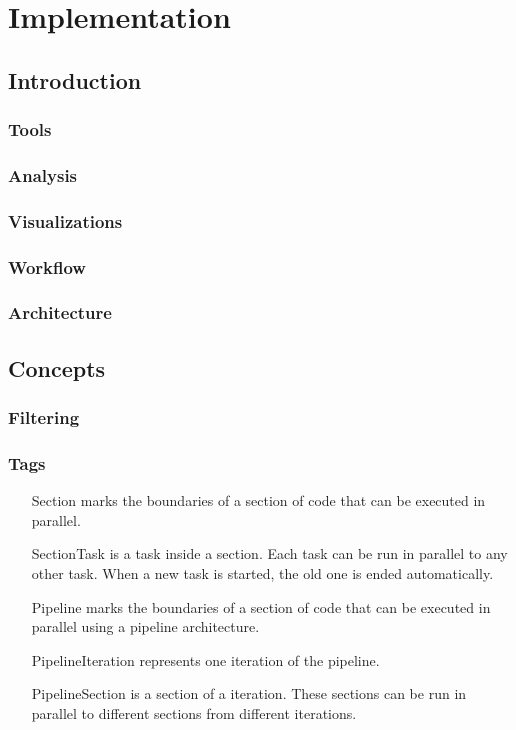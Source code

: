 \chapter{Implementation}

\section{Introduction}

\subsection{Tools}
\subsection{Analysis}
\subsection{Visualizations}
\subsection{Workflow}
\subsection{Architecture}

\section{Concepts}

\subsection{Filtering}

\subsection{Tags}

\begin{itemize}
	\item [Section] marks the boundaries of a section of code that can be executed in parallel.
	\item [SectionTask] is a task inside a section. Each task can be run in parallel to any other task. When a new task is started, the old one is ended automatically.
	\item [Pipeline] marks the boundaries of a section of code that can be executed in parallel using a pipeline architecture.
	\item [PipelineIteration] represents one iteration of the pipeline.
	\item [PipelineSection] is a section of a iteration. These sections can be run in parallel to different sections from different iterations.
\end{itemize}

